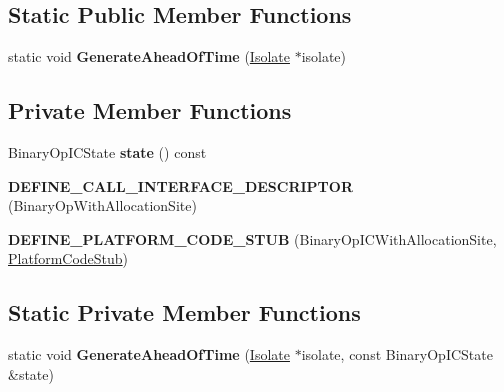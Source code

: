 \subsection*{Static Public Member Functions}
\begin{DoxyCompactItemize}
\item 
static void {\bfseries Generate\+Ahead\+Of\+Time} (\hyperlink{classv8_1_1internal_1_1_isolate}{Isolate} $\ast$isolate)\hypertarget{classv8_1_1internal_1_1_binary_op_i_c_with_allocation_site_stub_a6d82af00bec81623e009d3c1bdd5e510}{}\label{classv8_1_1internal_1_1_binary_op_i_c_with_allocation_site_stub_a6d82af00bec81623e009d3c1bdd5e510}

\end{DoxyCompactItemize}
\subsection*{Private Member Functions}
\begin{DoxyCompactItemize}
\item 
Binary\+Op\+I\+C\+State {\bfseries state} () const \hypertarget{classv8_1_1internal_1_1_binary_op_i_c_with_allocation_site_stub_a680d921196f419a34c20219ca8e3b2e2}{}\label{classv8_1_1internal_1_1_binary_op_i_c_with_allocation_site_stub_a680d921196f419a34c20219ca8e3b2e2}

\item 
{\bfseries D\+E\+F\+I\+N\+E\+\_\+\+C\+A\+L\+L\+\_\+\+I\+N\+T\+E\+R\+F\+A\+C\+E\+\_\+\+D\+E\+S\+C\+R\+I\+P\+T\+OR} (Binary\+Op\+With\+Allocation\+Site)\hypertarget{classv8_1_1internal_1_1_binary_op_i_c_with_allocation_site_stub_a2089d35d6a2efc4ae746ab8446b51d64}{}\label{classv8_1_1internal_1_1_binary_op_i_c_with_allocation_site_stub_a2089d35d6a2efc4ae746ab8446b51d64}

\item 
{\bfseries D\+E\+F\+I\+N\+E\+\_\+\+P\+L\+A\+T\+F\+O\+R\+M\+\_\+\+C\+O\+D\+E\+\_\+\+S\+T\+UB} (Binary\+Op\+I\+C\+With\+Allocation\+Site, \hyperlink{classv8_1_1internal_1_1_platform_code_stub}{Platform\+Code\+Stub})\hypertarget{classv8_1_1internal_1_1_binary_op_i_c_with_allocation_site_stub_a952f7bce1f4ab1cacc9b3f9f52e58563}{}\label{classv8_1_1internal_1_1_binary_op_i_c_with_allocation_site_stub_a952f7bce1f4ab1cacc9b3f9f52e58563}

\end{DoxyCompactItemize}
\subsection*{Static Private Member Functions}
\begin{DoxyCompactItemize}
\item 
static void {\bfseries Generate\+Ahead\+Of\+Time} (\hyperlink{classv8_1_1internal_1_1_isolate}{Isolate} $\ast$isolate, const Binary\+Op\+I\+C\+State \&state)\hypertarget{classv8_1_1internal_1_1_binary_op_i_c_with_allocation_site_stub_aaee240d063af995a607ac041240b1dc1}{}\label{classv8_1_1internal_1_1_binary_op_i_c_with_allocation_site_stub_aaee240d063af995a607ac041240b1dc1}

\end{DoxyCompactItemize}
